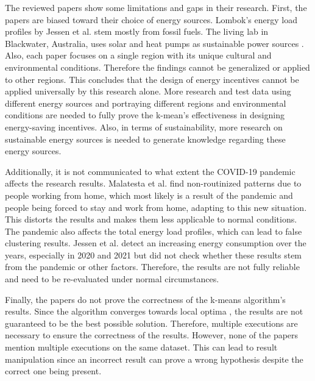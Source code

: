 The reviewed papers show some limitations and gaps in their research.
First, the papers are biased toward their choice of energy sources.
Lombok's energy load profiles by Jessen et al. \cite{JES-IND} stem mostly from fossil fuels.
The living lab in Blackwater, Australia, uses solar and heat pumps as sustainable power sources \cite{MAL-HBP}.
Also, each paper focuses on a single region with its unique cultural and environmental conditions.
Therefore the findings cannot be generalized or applied to other regions.
This concludes that the design of energy incentives cannot be applied universally by this research alone.
More research and test data using different energy sources and portraying different regions and environmental conditions are needed to fully prove the k-mean's effectiveness in designing energy-saving incentives. 
Also, in terms of sustainability, more research on sustainable energy sources is needed to generate knowledge regarding these energy sources.

Additionally, it is not communicated to what extent the COVID-19 pandemic affects the research results.
Malatesta et al. \cite{MAL-HBP} find non-routinized patterns due to people working from home, which most likely is a result of the pandemic and people being forced to stay and work from home, adapting to this new situation.
This distorts the results and makes them less applicable to normal conditions.
The pandemic also affects the total energy load profiles, which can lead to false clustering results.
Jessen et al. \cite{JES-IND} detect an increasing energy consumption over the years, especially in 2020 and 2021 but did not check whether these results stem from the pandemic or other factors.
Therefore, the results are not fully reliable and need to be re-evaluated under normal circumstances.

Finally, the papers do not prove the correctness of the k-means algorithm's results.
Since the algorithm converges towards local optima \cite{SEL-GCT}, the results are not guaranteed to be the best possible solution.
Therefore, multiple executions are necessary to ensure the correctness of the results.
However, none of the papers mention multiple executions on the same dataset.
This can lead to result manipulation since an incorrect result can prove a wrong hypothesis despite the correct one being present.

